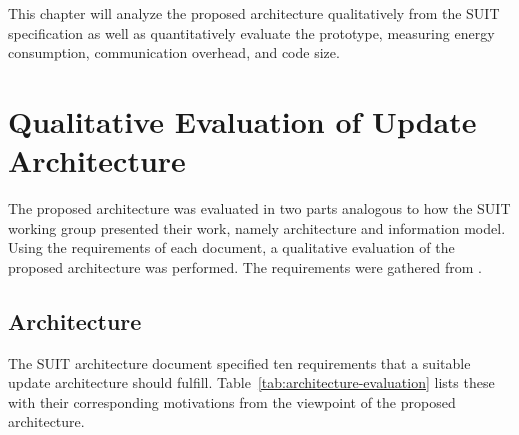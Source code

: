 \documentclass[0-thesis.tex]{subfiles}
\begin{document}
This chapter will analyze the proposed architecture qualitatively from the SUIT
specification as well as quantitatively evaluate the prototype, measuring energy
consumption, communication overhead, and code size.

\section{Qualitative Evaluation of Update Architecture}
\label{sec:qual-evaluation}
The proposed architecture was evaluated in two parts analogous to how the SUIT working
group presented their work, namely architecture and information model. Using the
requirements of each document, a qualitative evaluation of the proposed architecture was
performed. The requirements were gathered from \parencite{suit-architecture,
suit-information-model}.

\subsection{Architecture}
\label{ssec:arch-evaluation}
The SUIT architecture document specified ten requirements that a suitable update
architecture should fulfill. Table~\ref{tab:architecture-evaluation} lists these with
their corresponding motivations from the viewpoint of the proposed architecture.
\end{document}
